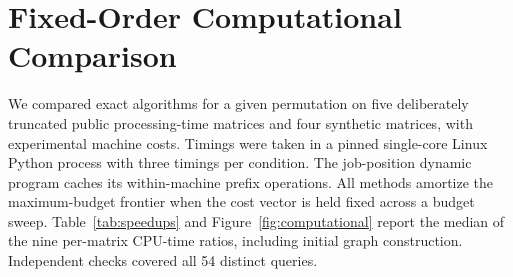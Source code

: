 \documentclass[11pt,letterpaper]{article}
\begin{document}
\section{Fixed-Order Computational Comparison}
\label{sec:computational}

We compared exact algorithms for a given permutation on five deliberately truncated public processing-time matrices and four synthetic matrices, with experimental machine costs. Timings were taken in a pinned single-core Linux Python process with three timings per condition. The job-position dynamic program caches its within-machine prefix operations. All methods amortize the maximum-budget frontier when the cost vector is held fixed across a budget sweep. Table~\ref{tab:speedups} and Figure~\ref{fig:computational} report the median of the nine per-matrix CPU-time ratios, including initial graph construction. Independent checks covered all 54 distinct queries.
\end{document}

